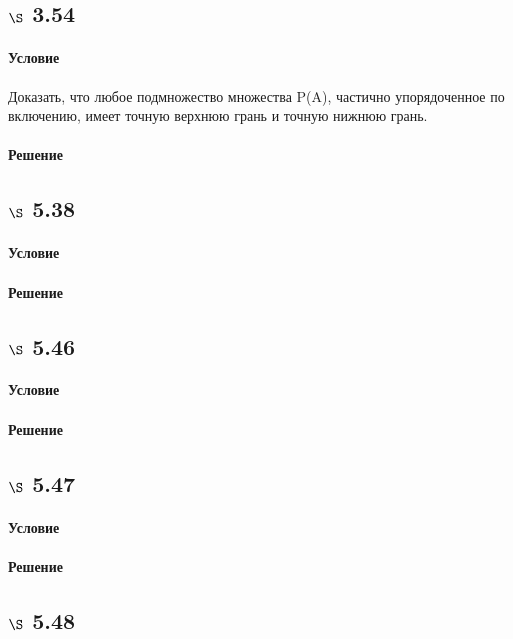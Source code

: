 \documentclass[a4paper,12pt]{article}
\begin{document}
\subsection*{$\S$ 3.54}
\paragraph*{Условие} Доказать, что любое подмножество множества P(A), частично упорядоченное по включению, имеет точную верхнюю грань и точную нижнюю грань.
\paragraph*{Решение}


\subsection*{$\S$ 5.38}
\paragraph*{Условие}
\paragraph*{Решение}

\subsection*{$\S$ 5.46}
\paragraph*{Условие}
\paragraph*{Решение}

\subsection*{$\S$ 5.47}
\paragraph*{Условие}
\paragraph*{Решение}

\subsection*{$\S$ 5.48}
\end{document}
